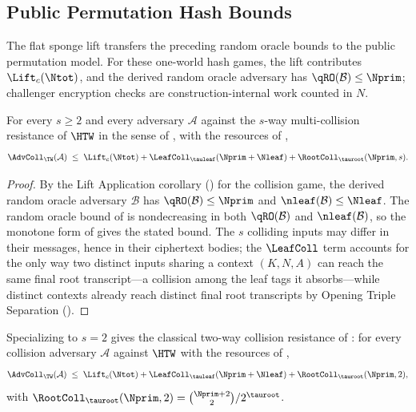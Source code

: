 \subsection{Public Permutation Hash Bounds}
\label{sec:root-tag-pp}

The flat sponge lift transfers the preceding random oracle bounds to the public
permutation model. For these one-world hash games, the lift contributes
$\Lift_c(\Ntot)$, and the derived random oracle adversary has
$\qRO(\mathcal{B}) \leq \Nprim$; challenger encryption checks are
construction-internal work counted in $N$.

\begin{theorem}
\label{thm:coll}
For every $s \geq 2$ and every adversary $\mathcal{A}$ against the $s$-way
multi-collision resistance of $\HTW$ in the sense of \cite{BH22}, with the
resources of ,
\[
  \AdvColl_\TW(\mathcal{A})
  \;\leq\;
  \Lift_c(\Ntot)
  + \LeafColl_{\tauleaf}(\Nprim+\Nleaf)
  + \RootColl_{\tauroot}(\Nprim, s).
\]
\end{theorem}

\begin{proof}
By the Lift Application corollary () for the
collision game, the derived random oracle adversary $\mathcal{B}$ has
$\qRO(\mathcal{B}) \leq \Nprim$ and $\nleaf(\mathcal{B}) \leq \Nleaf$. The
random oracle bound of  is nondecreasing in both
$\qRO(\mathcal{B})$ and $\nleaf(\mathcal{B})$, so the monotone form of
 gives the stated bound. The $s$ colliding
inputs may differ in their messages, hence in their ciphertext bodies; the
$\LeafColl$ term accounts for the only way two distinct inputs sharing a
context $(K, N, A)$ can reach the same final root transcript---a collision
among the leaf tags it absorbs---while distinct contexts already reach
distinct final root transcripts by Opening Triple Separation
().
\end{proof}

\begin{corollary}
\label{cor:coll-rs04}
Specializing  to $s = 2$ gives the classical two-way
collision resistance of \cite{RS04}: for every collision adversary
$\mathcal{A}$ against $\HTW$ with the resources of ,
\[
  \AdvColl_\TW(\mathcal{A})
  \;\leq\;
  \Lift_c(\Ntot)
  + \LeafColl_{\tauleaf}(\Nprim+\Nleaf)
  + \RootColl_{\tauroot}(\Nprim, 2),
\]
with $\RootColl_{\tauroot}(\Nprim, 2) = \binom{\Nprim + 2}{2} / 2^{\tauroot}$.
\end{corollary}

